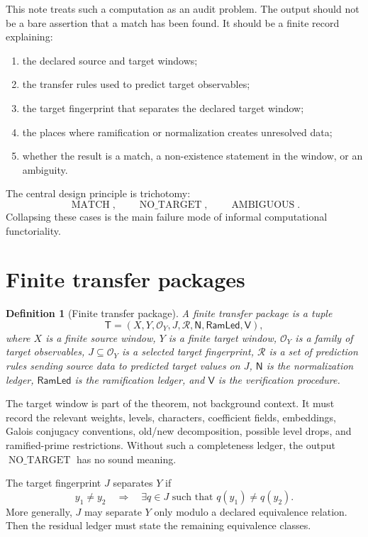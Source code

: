 \documentclass[11pt]{article}
\newtheorem{definition}[theorem]{Definition}
\DeclareMathOperator{\MATCH}{MATCH}
\DeclareMathOperator{\NOTARGET}{NO\_TARGET}
\DeclareMathOperator{\AMBIGUOUS}{AMBIGUOUS}
\begin{document}
This note treats such a computation as an audit problem.  The output should not be a bare assertion that a match has been found.  It should be a finite record explaining:
\begin{enumerate}[label=\textup{(\roman*)}]
\item the declared source and target windows;
\item the transfer rules used to predict target observables;
\item the target fingerprint that separates the declared target window;
\item the places where ramification or normalization creates unresolved data;
\item whether the result is a match, a non-existence statement in the window, or an ambiguity.
\end{enumerate}

The central design principle is trichotomy:
\[
\MATCH,\qquad
\NOTARGET,\qquad
\AMBIGUOUS.
\]
Collapsing these cases is the main failure mode of informal computational functoriality.

\section{Finite transfer packages}

\begin{definition}[Finite transfer package]
A finite transfer package is a tuple
\[
\mathsf T=(X,Y,\mathcal O_Y,J,\mathcal R,\mathsf N,\mathsf{RamLed},\mathsf V),
\]
where \(X\) is a finite source window, \(Y\) is a finite target window, \(\mathcal O_Y\) is a family of target observables, \(J\subseteq\mathcal O_Y\) is a selected target fingerprint, \(\mathcal R\) is a set of prediction rules sending source data to predicted target values on \(J\), \(\mathsf N\) is the normalization ledger, \(\mathsf{RamLed}\) is the ramification ledger, and \(\mathsf V\) is the verification procedure.
\end{definition}

The target window is part of the theorem, not background context.  It must record the relevant weights, levels, characters, coefficient fields, embeddings, Galois conjugacy conventions, old/new decomposition, possible level drops, and ramified-prime restrictions.  Without such a completeness ledger, the output \(\NOTARGET\) has no sound meaning.

The target fingerprint \(J\) separates \(Y\) if
\[
y_1\neq y_2\quad\Longrightarrow\quad
\exists q\in J\text{ such that }q(y_1)\neq q(y_2).
\]
More generally, \(J\) may separate \(Y\) only modulo a declared equivalence relation.  Then the residual ledger must state the remaining equivalence classes.
\end{document}
